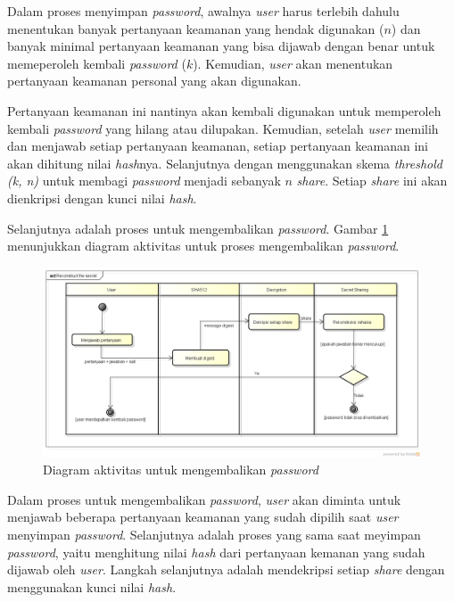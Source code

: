 Dalam proses menyimpan \textit{password}, awalnya \textit{user} harus terlebih dahulu menentukan banyak pertanyaan keamanan yang hendak digunakan (\begin{math}n\end{math}) dan banyak minimal pertanyaan keamanan yang bisa dijawab dengan benar untuk memeperoleh kembali \textit{password} (\begin{math}k\end{math}). Kemudian, \textit{user} akan menentukan pertanyaan keamanan personal yang akan digunakan.

Pertanyaan keamanan ini nantinya akan kembali digunakan untuk memperoleh kembali \textit{password} yang hilang atau dilupakan. Kemudian, setelah \textit{user} memilih dan menjawab setiap pertanyaan keamanan, setiap pertanyaan keamanan ini akan dihitung nilai \textit{hash}nya. Selanjutnya dengan menggunakan skema \textit{threshold (k, n)} untuk membagi \textit{password} menjadi sebanyak \begin{math}n\end{math} \textit{share}. Setiap \textit{share} ini akan dienkripsi dengan kunci nilai \textit{hash}.

Selanjutnya adalah proses untuk mengembalikan \textit{password}. Gambar \ref{fig:reconstruct} menunjukkan diagram aktivitas untuk proses mengembalikan \textit{password}.

\begin{figure}[H]
	\centerline{\includegraphics[scale=0.4]{Gambar/reconstruct-secret}}
	\caption{Diagram aktivitas untuk mengembalikan \textit{password}}\label{fig:reconstruct}
\end{figure}

Dalam proses untuk mengembalikan \textit{password}, \textit{user} akan diminta untuk menjawab beberapa pertanyaan keamanan yang sudah dipilih saat \textit{user} menyimpan \textit{password}. Selanjutnya adalah proses yang sama saat meyimpan \textit{password}, yaitu menghitung nilai \textit{hash} dari pertanyaan kemanan yang sudah dijawab oleh \textit{user}. Langkah selanjutnya adalah mendekripsi setiap \textit{share} dengan menggunakan kunci nilai \textit{hash}.


